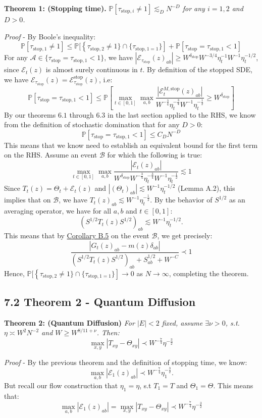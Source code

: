 \documentclass[11pt]{article}
\newenvironment{boxtheorem}[1]
  {\begin{mdframed}\noindent\textbf{#1}\itshape\space}
  {\end{mdframed}}
\newcommand{\E}{\mathcal{E}}
\newcommand{\sto}{\text{stop}}
\begin{document}
\begin{boxtheorem}{Theorem 1: (Stopping time).} $\mathbb{P}[\tau_{\text{stop}, i} \neq  1] \lesssim_D N^{-D}$ for any $i=1, 2$ and $D > 0$.
\end{boxtheorem}
\textit{Proof} - By Boole's inequality: $$\mathbb{P}\left[\tau_{\sto, 1}\neq 1\right]\leq \mathbb{P}[\left\{\tau_{\sto, 2}\neq 1\}\cap \{\tau_{\sto, 1=1}\}\right]+\mathbb{P}[\tau_\sto=\tau_{\sto, 1}<1]$$
For any $\mathcal{A}\in \{\tau_\sto = \tau_{\sto, 1}<1\}$, we have $|\E_{\tau_\sto}(z)_{ab}|\geq W^{\delta_\sto}W^{-3/4}\eta_t^{-1}W^{-1}\eta_t^{-1/2}$, since $\E_t(z)$ is almost surely continuous in $t$. By definition of the stopped SDE, we have $\E_{\tau_\sto}(z) = \E_{\tau_\sto}^{\sto}(z)$, i.e: $$\mathbb{P}\left[\tau_\sto = \tau_{\sto, 1}<1\right]\leq \mathbb{P}\left[\max_{t\in [0, 1]}\max_{a, b}\frac{|\E_t^{M, \sto}(z)_{ab}|}{W^{-\frac{3}{4}}\eta_t^{-\frac{3}{4}}W^{-1}\eta_t^{-\frac{1}{2}}}\geq W^{\delta_\sto}\right]$$
By our theorems $6.1$ through $6.3$ in the last section applied to the RHS, we know from the definition of stochastic domination that for any $D>0$: 
$$\mathbb{P}\left[ \tau_\sto = \tau_{\sto, 1}<1\right]\leq C_DN^{-D}$$
This means that we know need to establish an equivalent bound for the first term on the RHS. Assume an event $\mathcal{B}$ for which the following is true:
$$\max_{t\in [0, 1]}\max_{a, b}\frac{|\E_t(z)_{ab}|}{W^{\delta_\sto}W^{-\frac{3}{4}}\eta_t^{-\frac{3}{4}}W^{-1}\eta_t^{-\frac{1}{2}}}\lesssim 1$$
Since $T_t(z) = \Theta_t+\E_t(z)$ and $|(\Theta_t)_{ab}|\lesssim W^{-1}\eta_t^{-1/2}$ (Lemma A.2), this implies that on $\mathcal{B}$, we have $T_t(z)_{ab}\lesssim W^{-1}\eta_t^{-\frac{1}{2}}$. By the behavior of $S^{1/2}$ as an averaging operator, we have for all $a, b$ and $t\in [0, 1]$: $$(S^{1/2}T_t(z)S^{1/2})_{ab}\lesssim W^{-1}\eta_t^{-1/2}.$$ 
This means that by \hyperref[corollary-b5]{Corollary B.5} on the event $\mathcal{B}$, we get precisely: $$\frac{|G_t(z)_{ab}-m(z)\delta_{ab}|}{(S^{1/2}T_t(z)S^{1/2})_{ab}+S^{1/2}_{ab}+W^{-C}}\prec 1$$
Hence, $\mathbb{P}[\left\{\tau_{\sto, 2}\neq 1\}\cap \{\tau_{\sto, 1=1}\}\right]\rightarrow 0$ as $N\rightarrow \infty$, completing the theorem. 

\subsection*{7.2 Theorem 2 - Quantum Diffusion}
\begin{boxtheorem}{Theorem 2: (Quantum Diffusion)}
For $|E|<2$ fixed, assume $\exists \nu>0$, s.t. $\eta \asymp W^2 N^{-2}$ and $W\geq W^{8/11+\nu}$. Then: $$\max_{x, y}|T_{xy}-\Theta_{xy}|\prec W^{-\frac{7}{4}}\eta^{-\frac{3}{2}}$$
\end{boxtheorem}
\textit{Proof} - By the previous theorem and the definition of stopping time, we know: $$\max_{a,b}|\E_1(z)_{ab}|\prec W^{-\frac{7}{4}} \eta_1^{-\frac{3}{2}}.$$
But recall our flow construction that $\eta_1=\eta$, s.t $T_1=T$ and $\Theta_1=\Theta$. This means that: $$\max_{a,b}|\E_1(z)_{ab}| =\max_{x, y}|T_{xy}-\Theta_{xy}|\prec W^{-\frac{7}{4}}\eta^{-\frac{3}{2}}$$
\end{document}
